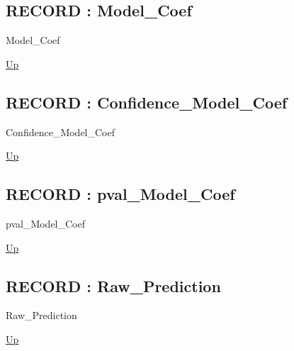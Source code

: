 \par
\par
\subsection*{RECORD : Model\_Coef}
\hypertarget{ecldoc:logisticregression.types.model_coef}{}
\begin{minipage}[t]{\textwidth}
\begin{flushleft}
 Model\_Coef 
\end{flushleft}
\end{minipage}
\hyperlink{ecldoc:LogisticRegression.Types}{Up}

\par
\par
\subsection*{RECORD : Confidence\_Model\_Coef}
\hypertarget{ecldoc:logisticregression.types.confidence_model_coef}{}
\begin{minipage}[t]{\textwidth}
\begin{flushleft}
 Confidence\_Model\_Coef 
\end{flushleft}
\end{minipage}
\hyperlink{ecldoc:LogisticRegression.Types}{Up}

\par
\par
\subsection*{RECORD : pval\_Model\_Coef}
\hypertarget{ecldoc:logisticregression.types.pval_model_coef}{}
\begin{minipage}[t]{\textwidth}
\begin{flushleft}
 pval\_Model\_Coef 
\end{flushleft}
\end{minipage}
\hyperlink{ecldoc:LogisticRegression.Types}{Up}

\par
\par
\subsection*{RECORD : Raw\_Prediction}
\hypertarget{ecldoc:logisticregression.types.raw_prediction}{}
\begin{minipage}[t]{\textwidth}
\begin{flushleft}
 Raw\_Prediction 
\end{flushleft}
\end{minipage}
\hyperlink{ecldoc:LogisticRegression.Types}{Up}


